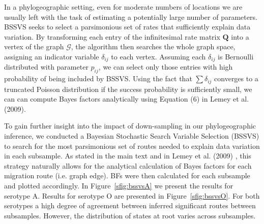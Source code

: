 \documentclass[a4paper,10pt]{article}
\begin{document}

In a phylogeographic setting, even for moderate numbers of locations we are usually left with the task of estimating a potentially large number of parameters. 
BSSVS seeks to select a parsimonious set of rates that sufficiently explain data variation.
By transforming each entry of the infinitesimal rate matrix $\mathbf{Q}$ into a vertex of the graph $\mathcal{G}$, the algorithm then searches the whole graph space, assigning an indicator variable $\delta_{ij}$ to each vertex.
Assuming each $\delta_{ij}$ is Bernoulli distributed with parameter $p_{ij}$, we can select only those entries with high probability of being included by BSSVS.
Using the fact that $\sum\delta_{ij}$ converges to a truncated Poisson distribution if the success probability is sufficiently small, we can can compute Bayes factors analytically using Equation (6) in Lemey et al. (2009).

To gain further insight into the impact of down-sampling in our phylogeographic inference, we conducted a Bayesian Stochastic Search Variable Selection (BSSVS) to search for the most parsimonious set of routes needed to explain data variation in each subsample.
As stated in the main text and in Lemey et al. (2009) \cite{M-roots}, this strategy naturally allows for the analytical calculation of Bayes factors for each migration route (i.e. graph edge).
BFs were then calculated for each subsample and plotted accordingly.
In Figure~\ref{sfig:bssvsA} we present the results for serotype A.
Results for serotype O are presented in Figure~\ref{sfig:bssvsO}.
For both serotypes a high degree of agreement between inferred significant routes between subsamples.
However, the distribution of states at root varies across subsamples.



\newpage

\end{document}
